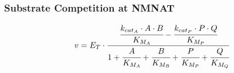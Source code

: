 \documentclass[a4paper,10pt]{article}
\begin{document}
\subsubsection*{Substrate Competition at NMNAT}
\begin{equation}
v=E_T \cdot \cfrac{\cfrac{k_{{cat}_{A}}\cdot A \cdot
B}{K_{{M}_A}}-\cfrac{k_{{cat}_{P}}\cdot P \cdot
Q}{K_{{M}_P}}}{1+\cfrac{A}{K_{{M}_A}}+\cfrac{B}{K_{{M}_B}}+\cfrac{P}{K_{{M}_P}}+\cfrac{Q}{K_{{M}_Q}}}
\end{equation}





\end{document}
